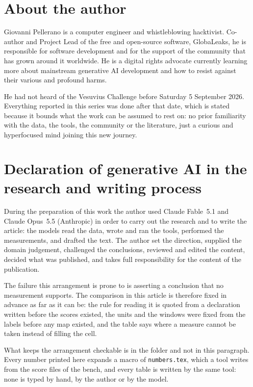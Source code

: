 
\section*{About the author}

Giovanni Pellerano is a computer engineer and whistleblowing hacktivist.
Co-author and Project Lead of the free and open-source software, GlobaLeaks, he
is responsible for software development and for the support of the community that has grown
around it worldwide. He is a digital rights advocate currently learning more about mainstream
generative AI development and how to resist against their various and profound harms.

He had not heard of the Vesuvius Challenge before Saturday 5 September 2026. Everything reported
in this series was done after that date, which is stated because it bounds what the work can be
assumed to rest on: no prior familiarity with the data, the tools, the community or the
literature, just a curious and hyperfocused mind joining this new journey.

\section*{Declaration of generative AI in the research and writing process}

During the preparation of this work the author used Claude Fable~5.1 and Claude Opus~5.5 (Anthropic) in order
to carry out the research and to write the article: the models read the data, wrote and ran the tools,
performed the measurements, and drafted the text. The author set the direction, supplied the domain
judgement, challenged the conclusions, reviewed and edited the content, decided what was
published, and takes full responsibility for the content of the publication.

The failure this arrangement is prone to is asserting a conclusion that no measurement supports. The
comparison in this article is therefore fixed in advance as far as it can be: the rule for reading it is
quoted from a declaration written before the scores existed, the units and the windows were fixed from the
labels before any map existed, and the table says where a measure cannot be taken instead of filling the cell.

What keeps the arrangement checkable is in the folder and not in this paragraph. Every number printed here
expands a macro of \texttt{numbers.tex}, which a tool writes from the score files of the bench, and every table
is written by the same tool: none is typed by hand, by the author or by the model.
